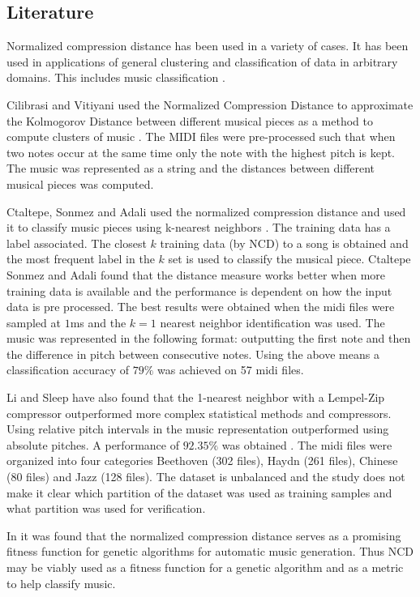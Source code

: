\subsection{Literature}
Normalized compression distance has been used in a variety of cases. It has been used in applications of general clustering and classification of data in arbitrary domains. This includes music classification \cite{1412045}.

Cilibrasi and Vitiyani used the Normalized Compression Distance to approximate the Kolmogorov Distance between different musical pieces as a method to compute clusters of music \cite{1412045}. The \ac{MIDI} files were pre-processed such that when two notes occur at the same time only the note with the highest pitch is kept. The music was represented as a string and the distances between different musical pieces was computed.


Ctaltepe, Sonmez and Adali used the normalized compression distance and used it to classify music pieces using k-nearest neighbors \cite{Cataltepe2005}. 
The training data has a label associated. The closest $k$ training data (by \ac{NCD}) to a song is obtained and the most frequent label in the $k$ set is used to classify the musical piece. 
Ctaltepe Sonmez and Adali found that the distance measure works better when more training data is available and the performance is dependent on how the input data is pre processed. 
The best results were obtained when the midi files were sampled at $1$ms and the $k=1$ nearest neighbor identification was used. 
The music was represented in the following format: outputting the first note and then the difference in pitch between consecutive notes. Using the above means a classification accuracy of $79\%$ was achieved on 57 midi files.

Li and Sleep have also found that the 1-nearest neighbor with a Lempel-Zip compressor outperformed more complex statistical methods and compressors. Using relative pitch intervals in the music representation outperformed using absolute pitches. A performance of $92.35\%$ was obtained \cite{Ling2004}.
The midi files were organized into four categories Beethoven (302 files), Haydn (261 files), Chinese (80 files) and Jazz (128 files). The dataset is unbalanced and the study does not make it clear which partition of the dataset was used as training samples and what partition was used for verification.

In \cite{Alfonseca2007, Alfonseca:2005:ECM:1981094.1981161, Ling2004,Alfonseca2006} it was found that the normalized compression distance serves as a promising fitness function for genetic algorithms for automatic music generation. Thus \ac{NCD} may be viably used as a fitness function for a genetic algorithm and as a metric to help classify music.

